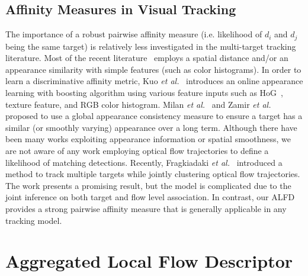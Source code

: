 \documentclass[10pt,twocolumn,letterpaper]{article}
\begin{document}
\subsection{Affinity Measures in Visual Tracking}
The importance of a robust pairwise affinity measure (i.e. likelihood of $d_i$ and $d_j$ being the same target) is relatively less investigated in the multi-target tracking literature. Most of the recent literature~\cite{Andriyenko:2012:DCO,BerclazFTF11,Pirsiavash_CVPR_11,ZamirECCV12} employs a spatial distance and/or an appearance similarity with simple features (such as color histograms). In order to learn a discriminative affinity metric, Kuo \emph{et al.}~\cite{Kuo_CVPR_10} introduces an online appearance learning with boosting algorithm using various feature inputs such as HoG~\cite{dalal2005histograms}, texture feature, and RGB color histogram. Milan \emph{et al.}~\cite{Milan:2014:CEM} and Zamir \emph{et al.}~\cite{ZamirECCV12} proposed to use a global appearance consistency measure to ensure a target has a similar (or smoothly varying) appearance over a long term. Although there have been many works exploiting appearance information or spatial smoothness, we are not aware of any work employing optical flow trajectories to define a likelihood of matching detections. Recently, Fragkiadaki \emph{et al.}~\cite{FragkiadakiZZS12} introduced a method to track multiple targets while jointly clustering optical flow trajectories. The work presents a promising result, but the model is complicated due to the joint inference on both target and flow level association. In contrast, our ALFD provides a strong pairwise affinity measure that is generally applicable in any tracking model.

\section{Aggregated Local Flow Descriptor}
\label{sec:ALFD}
\end{document}
